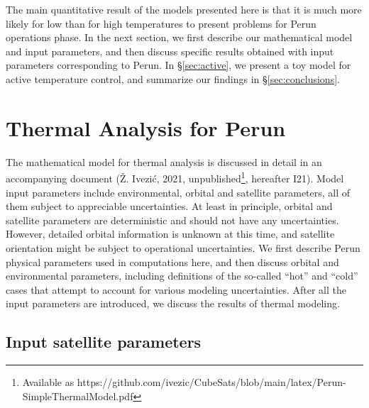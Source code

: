 \documentclass[]{aastex62}
\begin{document}
The main quantitative result of the models presented here is that it is much more likely 
for low than for high temperatures to present problems for Perun operations phase. 
In the next section, we first describe our mathematical model and input parameters, and then 
discuss specific results obtained with input parameters corresponding to Perun. In \S\ref{sec:active},
we present a toy model for active temperature control, and summarize our findings in \S\ref{sec:conclusions}. 



\section{Thermal Analysis for Perun} 

The mathematical model for thermal analysis is discussed in detail in an accompanying document 
(\v{Z}. Ivezi\'{c}, 2021, unpublished\footnote{Available as https://github.com/ivezic/CubeSats/blob/main/latex/Perun-SimpleThermalModel.pdf}, 
hereafter I21).  
Model input parameters include environmental, orbital and satellite parameters, all of them
subject to appreciable uncertainties. At least in principle, orbital and satellite parameters 
are deterministic and should not have any uncertainties. However, detailed orbital information
is unknown at this time, and satellite orientation might be subject to 
operational uncertainties. We first describe Perun physical parameters used in computations
here, and then discuss orbital and environmental parameters, including definitions of the 
so-called ``hot'' and ``cold'' cases that attempt to account for various modeling uncertainties. 
After all the input parameters are introduced, we discuss the results of thermal modeling. 
 

\subsection{Input satellite parameters}
\end{document}
